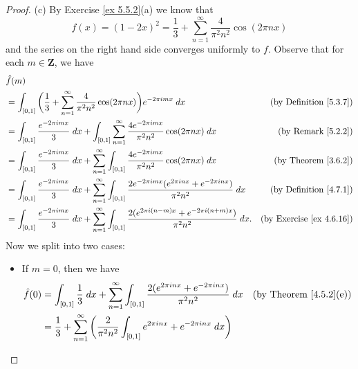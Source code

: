 \begin{proof}{(c)}
    By Exercise \ref{ex 5.5.2}(a) we know that
    \[
        f(x) = (1 - 2x)^2 = \frac{1}{3} + \sum_{n = 1}^\infty \frac{4}{\pi^2 n^2} \cos(2 \pi n x)
    \]
    and the series on the right hand side converges uniformly to \(f\).
    Observe that for each \(m \in \mathbf{Z}\), we have
    \begin{align*}
         & \hat{f}(m)                                                                                                                                                                                                     \\
         & = \int_{[0, 1]} \bigg(\frac{1}{3} + \sum_{n = 1}^\infty \frac{4}{\pi^2 n^2} \cos(2 \pi n x)\bigg) e^{-2 \pi i m x} \; dx                                                & \text{(by Definition \ref{5.3.7})}   \\
         & = \int_{[0, 1]} \frac{e^{- 2 \pi i m x}}{3} \; dx + \int_{[0, 1]} \sum_{n = 1}^\infty \frac{4 e^{- 2 \pi i m x}}{\pi^2 n^2} \cos(2 \pi n x) \; dx                       & \text{(by Remark \ref{5.2.2})}       \\
         & = \int_{[0, 1]} \frac{e^{- 2 \pi i m x}}{3} \; dx + \sum_{n = 1}^\infty \int_{[0, 1]} \frac{4 e^{- 2 \pi i m x}}{\pi^2 n^2} \cos(2 \pi n x) \; dx                       & \text{(by Theorem \ref{3.6.2})}      \\
         & = \int_{[0, 1]} \frac{e^{- 2 \pi i m x}}{3} \; dx + \sum_{n = 1}^\infty \int_{[0, 1]} \frac{2 e^{- 2 \pi i m x} (e^{2 \pi i n x} + e^{- 2 \pi i n x})}{\pi^2 n^2} \; dx & \text{(by Definition \ref{4.7.1})}   \\
         & = \int_{[0, 1]} \frac{e^{- 2 \pi i m x}}{3} \; dx + \sum_{n = 1}^\infty \int_{[0, 1]} \frac{2 (e^{2 \pi i (n - m) x} + e^{- 2 \pi i (n + m) x})}{\pi^2 n^2} \; dx.      & \text{(by Exercise \ref{ex 4.6.16})}
    \end{align*}
    Now we split into two cases:
    \begin{itemize}
        \item If \(m = 0\), then we have
              \begin{align*}
                  \hat{f}(0) & = \int_{[0, 1]} \frac{1}{3} \; dx + \sum_{n = 1}^\infty \int_{[0, 1]} \frac{2 (e^{2 \pi i n x} + e^{- 2 \pi i n x})}{\pi^2 n^2} \; dx & \text{(by Theorem \ref{4.5.2}(e))} \\
                             & = \frac{1}{3} + \sum_{n = 1}^\infty \bigg(\frac{2}{\pi^2 n^2} \int_{[0, 1]} e^{2 \pi i n x} + e^{- 2 \pi i n x} \; dx\bigg)                                                \\

\end{align*}
\end{itemize}
\end{proof}
